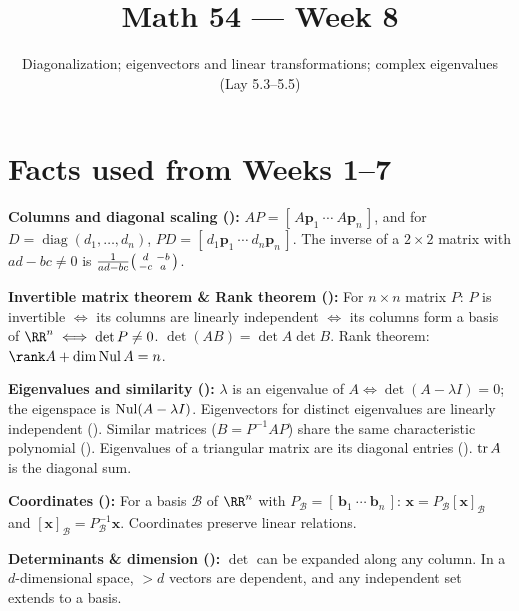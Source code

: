 \documentclass[10pt]{scrartcl}
\title{Math 54 --- Week 8}
\subtitle{Diagonalization; eigenvectors and linear transformations; complex eigenvalues (Lay 5.3--5.5)}
\author{}\date{}\ihead{}
\newcommand{\vv}[1]{\mathbf{#1}}
\begin{document}
\maketitle

\section{Facts used from Weeks 1--7}

\begin{enumerate}[label=(W\arabic*),leftmargin=2.8em,itemsep=4pt]
  \ii {}\textbf{Columns and diagonal scaling ():} $AP=[\,A\vv p_1\ \cdots\ A\vv p_n\,]$, and for $D=\operatorname{diag}(d_1,\dots,d_n)$, $PD=[\,d_1\vv p_1\ \cdots\ d_n\vv p_n\,]$. The inverse of a $2\times2$ matrix with $ad-bc\ne0$ is $\frac{1}{ad-bc}\begin{psmallmatrix}d&-b\\-c&a\end{psmallmatrix}$.

  \ii {}\textbf{Invertible matrix theorem \& Rank theorem ():} For $n\times n$ matrix $P$: $P$ is invertible $\iff$ its columns are linearly independent $\iff$ its columns form a basis of $\RR^n \iff \det P\ne 0$. $\det(AB)=\det A\det B$. Rank theorem: $\rank A+\dim\Nul A=n$.

  \ii {}\textbf{Eigenvalues and similarity ():} $\lambda$ is an eigenvalue of $A \iff \det(A-\lambda I)=0$; the eigenspace is $\operatorname{Nul}(A-\lambda I)$. Eigenvectors for distinct eigenvalues are linearly independent (). Similar matrices ($B=P^{-1}AP$) share the same characteristic polynomial (). Eigenvalues of a triangular matrix are its diagonal entries (). $\operatorname{tr} A$ is the diagonal sum.

  \ii {}\textbf{Coordinates ():} For a basis $\mathcal B$ of $\RR^n$ with $P_{\mathcal B}=[\,\vv b_1\ \cdots\ \vv b_n\,]$: $\vv x=P_{\mathcal B}[\vv x]_{\mathcal B}$ and $[\vv x]_{\mathcal B}=P_{\mathcal B}^{-1}\vv x$. Coordinates preserve linear relations.

  \ii {}\textbf{Determinants \& dimension ():} $\det$ can be expanded along any column. In a $d$-dimensional space, $>d$ vectors are dependent, and any independent set extends to a basis.
\end{enumerate}
\end{document}
